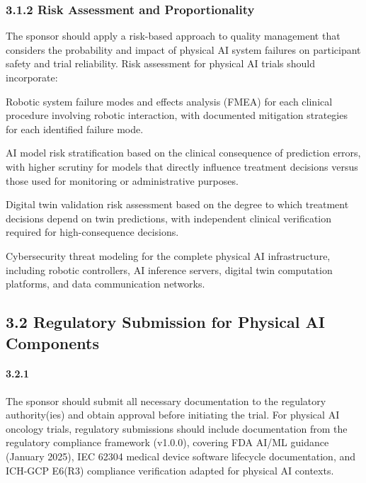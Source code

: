 \subsubsection{3.1.2 Risk Assessment and Proportionality}

The sponsor should apply a risk-based approach to quality management that considers the probability and impact of physical AI system failures on participant safety and trial reliability. Risk assessment for physical AI trials should incorporate:

\begin{description}[leftmargin=2.5cm,style=sameline]

\item[(a)] Robotic system failure modes and effects analysis (FMEA) for each clinical procedure involving robotic interaction, with documented mitigation strategies for each identified failure mode.

\item[(b)] AI model risk stratification based on the clinical consequence of prediction errors, with higher scrutiny for models that directly influence treatment decisions versus those used for monitoring or administrative purposes.

\item[(c)] Digital twin validation risk assessment based on the degree to which treatment decisions depend on twin predictions, with independent clinical verification required for high-consequence decisions.

\item[(d)] Cybersecurity threat modeling for the complete physical AI infrastructure, including robotic controllers, AI inference servers, digital twin computation platforms, and data communication networks.

\end{description}

\subsection{3.2 Regulatory Submission for Physical AI Components}

\paragraph{3.2.1} The sponsor should submit all necessary documentation to the regulatory authority(ies) and obtain approval before initiating the trial. For physical AI oncology trials, regulatory submissions should include documentation from the regulatory compliance framework (v1.0.0), covering FDA AI/ML guidance (January 2025), IEC 62304 medical device software lifecycle documentation, and ICH-GCP E6(R3) compliance verification adapted for physical AI contexts.

